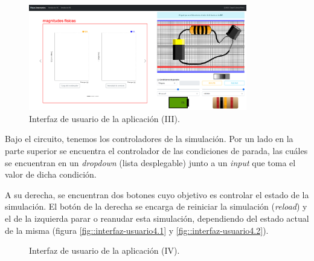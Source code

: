 \documentclass[../main.tex]{subfiles}
\begin{document}
\begin{figure}[!ht]
  \centering
  \includegraphics[width=0.85\textwidth]{images/resultados.png}
  \caption{Interfaz de usuario de la aplicación (III).}
  \label{fig::interfaz-usuario3}
\end{figure}

Bajo el circuito, tenemos los controladores de la simulación. Por un lado en la parte superior se encuentra el controlador de las condiciones de parada, las cuáles se encuentran en un \textit{dropdown} (lista desplegable) junto a un \textit{input} que toma el valor de dicha condición.

A su derecha, se encuentran dos botones cuyo objetivo es controlar el estado de la simulación. El botón de la derecha se encarga de reiniciar la simulación (\textit{reload}) y el de la izquierda parar o reanudar esta simulación, dependiendo del estado actual de la misma (figura \ref{fig::interfaz-usuario4.1} y \ref{fig::interfaz-usuario4.2}). \\

\begin{figure}[!ht]
  \centering
  \quad


  \caption{Interfaz de usuario de la aplicación (IV).}
  \label{fig::interfaz-usuario4}

\end{figure}
\end{document}
